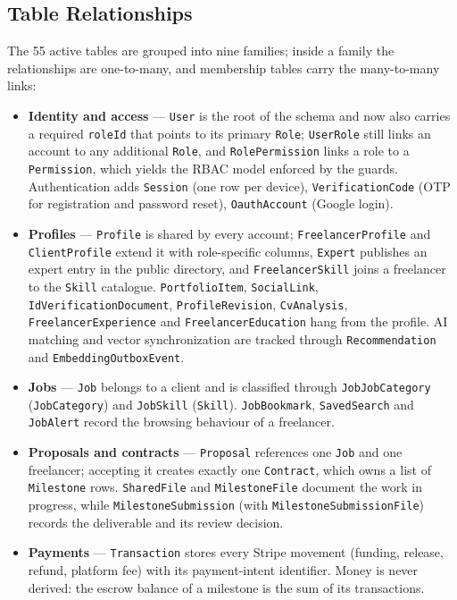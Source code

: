 \subsection{Table Relationships}

The 55 active tables are grouped into nine families; inside a family the relationships are
one-to-many, and membership tables carry the many-to-many links:

\begin{itemize}[leftmargin=*]\sloppy
    \item \textbf{Identity and access} --- \texttt{User} is the root of the schema and now also carries a required \texttt{roleId} that points to its primary \texttt{Role}; \texttt{UserRole} still links an account to any additional \texttt{Role}, and \texttt{RolePermission} links a role to a \texttt{Permission}, which yields the RBAC model enforced by the guards. Authentication adds \texttt{Session} (one row per device), \texttt{VerificationCode} (OTP for registration and password reset), \texttt{OauthAccount} (Google login).
    \item \textbf{Profiles} --- \texttt{Profile} is shared by every account; \texttt{FreelancerProfile} and \texttt{ClientProfile} extend it with role-specific columns, \texttt{Expert} publishes an expert entry in the public directory, and \texttt{FreelancerSkill} joins a freelancer to the \texttt{Skill} catalogue. \texttt{PortfolioItem}, \texttt{SocialLink}, \texttt{IdVerificationDocument}, \texttt{ProfileRevision}, \texttt{CvAnalysis}, \texttt{FreelancerExperience} and \texttt{FreelancerEducation} hang from the profile. AI matching and vector synchronization are tracked through \texttt{Recommendation} and \texttt{EmbeddingOutboxEvent}.
    \item \textbf{Jobs} --- \texttt{Job} belongs to a client and is classified through \texttt{JobJobCategory} (\texttt{JobCategory}) and \texttt{JobSkill} (\texttt{Skill}). \texttt{JobBookmark}, \texttt{SavedSearch} and \texttt{JobAlert} record the browsing behaviour of a freelancer.
    \item \textbf{Proposals and contracts} --- \texttt{Proposal} references one \texttt{Job} and one freelancer; accepting it creates exactly one \texttt{Contract}, which owns a list of \texttt{Milestone} rows. \texttt{SharedFile} and \texttt{MilestoneFile} document the work in progress, while \texttt{MilestoneSubmission} (with \texttt{MilestoneSubmissionFile}) records the deliverable and its review decision.
    \item \textbf{Payments} --- \texttt{Transaction} stores every Stripe movement (funding, release, refund, platform fee) with its payment-intent identifier. Money is never derived: the escrow balance of a milestone is the sum of its transactions.

\end{itemize}
